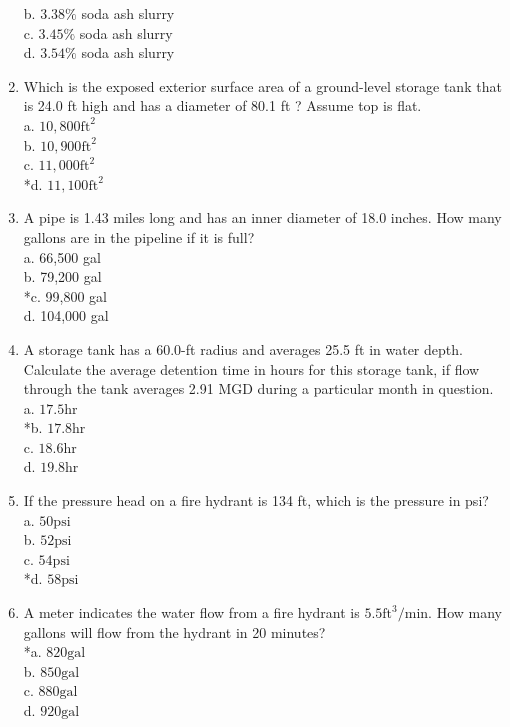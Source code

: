 \begin{enumerate}
b. $3.38 \%$ soda ash slurry\\
c. $3.45 \%$ soda ash slurry\\
d. $3.54 \%$ soda ash slurry\\
\item Which is the exposed exterior surface area of a ground-level storage tank that is 24.0 ft high and has a diameter of 80.1 ft ? Assume top is flat.\\
a. $10,800 \mathrm{ft}^{2}$\\
b. $10,900 \mathrm{ft}^{2}$\\
c. $11,000 \mathrm{ft}^{2}$\\
*d. $11,100 \mathrm{ft}^{2}$\\
\item A pipe is 1.43 miles long and has an inner diameter of 18.0 inches. How many gallons are in the pipeline if it is full?\\
a. 66,500 gal\\
b. 79,200 gal\\
*c. 99,800 gal\\
d. 104,000 gal\\
\item A storage tank has a 60.0-ft radius and averages 25.5 ft in water depth. Calculate the average detention time in hours for this storage tank, if flow through the tank averages 2.91 MGD during a particular month in question.\\
a. $17.5 \mathrm{hr}$\\
*b. $17.8 \mathrm{hr}$\\
c. $18.6 \mathrm{hr}$\\
d. $19.8 \mathrm{hr}$ \\
\item If the pressure head on a fire hydrant is 134 ft, which is the pressure in psi?\\
a. $50 \mathrm{psi}$\\
b. $52 \mathrm{psi}$\\
c. $54 \mathrm{psi}$\\
*d. $58 \mathrm{psi}$\\
\item A meter indicates the water flow from a fire hydrant is $5.5 \mathrm{ft}^{3} / \mathrm{min}$. How many gallons will flow from the hydrant in 20 minutes?\\
*a. $820 \mathrm{gal}$\\
b. $850 \mathrm{gal}$\\
c. $880 \mathrm{gal}$\\
d. $920 \mathrm{gal}$\\

\end{enumerate}
